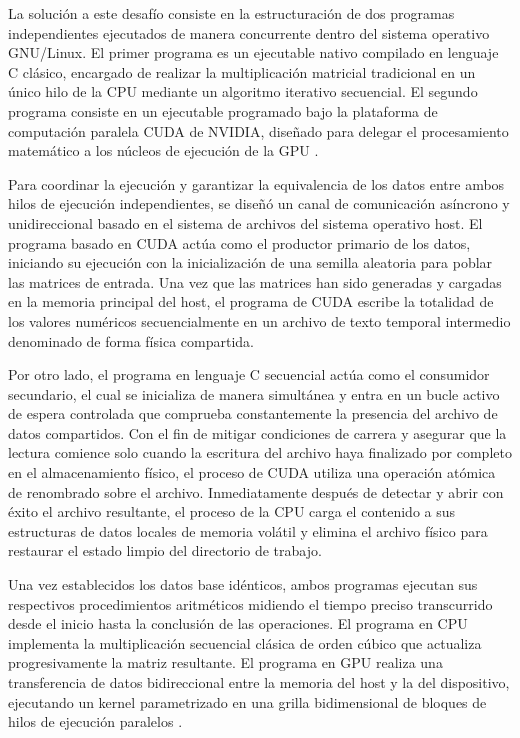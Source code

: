 La solución a este desafío consiste en la estructuración de dos programas independientes ejecutados de manera concurrente dentro del sistema operativo GNU/Linux. El primer programa es un ejecutable nativo compilado en lenguaje C clásico, encargado de realizar la multiplicación matricial tradicional en un único hilo de la CPU mediante un algoritmo iterativo secuencial. El segundo programa consiste en un ejecutable programado bajo la plataforma de computación paralela CUDA de NVIDIA, diseñado para delegar el procesamiento matemático a los núcleos de ejecución de la GPU \cite{nvidiaCUDA}.

Para coordinar la ejecución y garantizar la equivalencia de los datos entre ambos hilos de ejecución independientes, se diseñó un canal de comunicación asíncrono y unidireccional basado en el sistema de archivos del sistema operativo host. El programa basado en CUDA actúa como el productor primario de los datos, iniciando su ejecución con la inicialización de una semilla aleatoria para poblar las matrices de entrada. Una vez que las matrices han sido generadas y cargadas en la memoria principal del host, el programa de CUDA escribe la totalidad de los valores numéricos secuencialmente en un archivo de texto temporal intermedio denominado de forma física compartida.

Por otro lado, el programa en lenguaje C secuencial actúa como el consumidor secundario, el cual se inicializa de manera simultánea y entra en un bucle activo de espera controlada que comprueba constantemente la presencia del archivo de datos compartidos. Con el fin de mitigar condiciones de carrera y asegurar que la lectura comience solo cuando la escritura del archivo haya finalizado por completo en el almacenamiento físico, el proceso de CUDA utiliza una operación atómica de renombrado sobre el archivo. Inmediatamente después de detectar y abrir con éxito el archivo resultante, el proceso de la CPU carga el contenido a sus estructuras de datos locales de memoria volátil y elimina el archivo físico para restaurar el estado limpio del directorio de trabajo.

Una vez establecidos los datos base idénticos, ambos programas ejecutan sus respectivos procedimientos aritméticos midiendo el tiempo preciso transcurrido desde el inicio hasta la conclusión de las operaciones. El programa en CPU implementa la multiplicación secuencial clásica de orden cúbico que actualiza progresivamente la matriz resultante. El programa en GPU realiza una transferencia de datos bidireccional entre la memoria del host y la del dispositivo, ejecutando un kernel parametrizado en una grilla bidimensional de bloques de hilos de ejecución paralelos \cite{threadHierarchy}.

